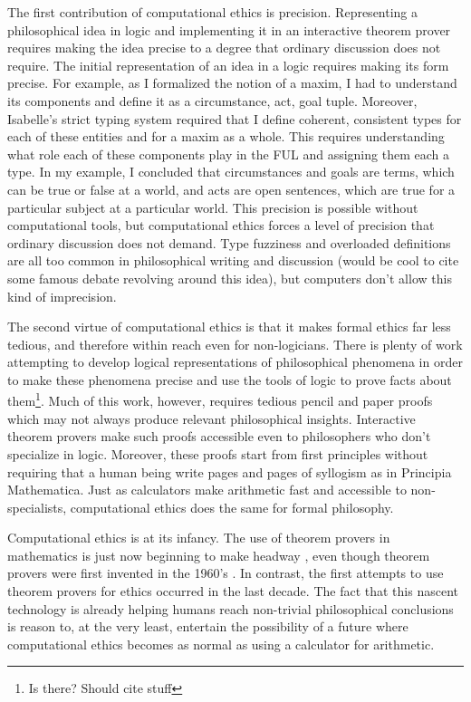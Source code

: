 \begin{isabellebody}
\begin{isamarkuptext}
The first contribution of computational ethics is precision.
Representing a philosophical idea in logic and implementing it in an interactive theorem prover requires 
making the idea precise to a degree that ordinary discussion does not require. The initial representation 
of an idea in a logic requires making its form precise. For example, 
as I formalized the notion of a maxim, I had to understand its components and define it as a 
circumstance, act, goal tuple. Moreover, Isabelle's strict typing system required that I define 
coherent, consistent types for each of these entities and for a maxim as a whole. This requires understanding 
what role each of these components play in the FUL and assigning them each a type. In my example, I 
concluded that circumstances and goals are terms, which can be true or false at a world, and acts are 
open sentences, which are true for a particular subject at a particular world. This precision is possible 
without computational tools, but computational ethics forces a level of precision that ordinary discussion 
does not demand. Type fuzziness and overloaded definitions are all too common in philosophical writing and 
discussion (would be cool to cite some famous debate revolving around this idea), but computers don't 
allow this kind of imprecision.

The second virtue of computational ethics is that it makes formal ethics far less tedious, and therefore 
within reach even for non-logicians. There is plenty of work attempting to develop logical representations 
of philosophical phenomena in order to make these phenomena precise and use the tools of logic to prove 
facts about them\footnote{Is there? Should cite stuff}. Much of this work, however, requires tedious pencil and paper proofs which may not 
always produce relevant philosophical insights. Interactive theorem provers make such proofs accessible 
even to philosophers who don't specialize in logic. Moreover, these proofs start from first principles 
without requiring that a human being write pages and pages of syllogism as in Principia Mathematica. 
Just as calculators make arithmetic fast and accessible to non-specialists, computational ethics does the same for 
formal philosophy.%
\end{isamarkuptext}\isamarkuptrue%
%
\isadelimdocument
%
\endisadelimdocument
%
\isatagdocument
%
\isamarkuptrue%
%
\endisatagdocument
{\isafolddocument}%
%
\isadelimdocument
%
\endisadelimdocument
%
\begin{isamarkuptext}%
Computational ethics is at its infancy. The use of theorem provers in mathematics is just now beginning 
to make headway \cite{buzzardvideo}, even though theorem provers were first invented in the 1960's \cite{historyofITP}. In contrast, the first attempts to use theorem 
provers for ethics occurred in the last decade. The fact that this nascent technology is already 
helping humans reach non-trivial philosophical conclusions is reason to, at the very least, entertain 
the possibility of a future where computational ethics becomes as normal as using a calculator for arithmetic.


\end{isamarkuptext}
\end{isabellebody}
